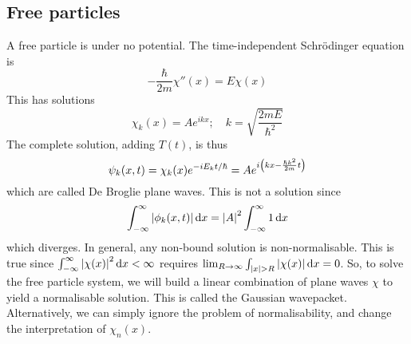 \subsection{Free particles}
A free particle is under no potential.
The time-independent Schr\"odinger equation is
\[
	-\frac{\hbar}{2m} \chi''(x) = E\chi(x)
\]
This has solutions
\[
	\chi_k(x) = A e^{i k x};\quad k = \sqrt{\frac{2mE}{\hbar^2}}
\]
The complete solution, adding \( T(t) \), is thus
\[
	\psi_k(x,t) = \chi_k(x) e^{-i E_k t / \hbar} = A e^{i\qty(kx - \frac{\hbar k^2}{2m} t)}
\]
which are called De Broglie plane waves.
This is not a solution since
\[
	\int_{-\infty}^\infty \abs{\phi_k(x,t)} \dd{x} = \abs{A}^2 \int_{-\infty}^\infty 1 \dd{x}
\]
which diverges.
In general, any non-bound solution is non-normalisable.
This is true since \( \int_{-\infty}^\infty \abs{\chi(x)}^2 \dd{x} < \infty \) requires \( \lim_{R \to \infty} \int_{\abs{x} > R} \abs{\chi(x)} \dd{x} = 0 \).
So, to solve the free particle system, we will build a linear combination of plane waves \( \chi \) to yield a normalisable solution.
This is called the Gaussian wavepacket.
Alternatively, we can simply ignore the problem of normalisability, and change the interpretation of \( \chi_n(x) \).

